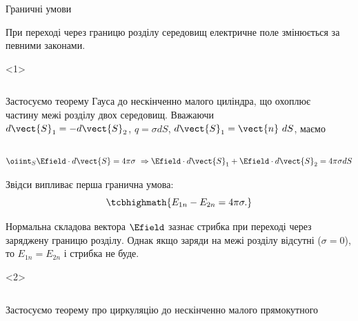 \documentclass{beamer}
\begin{document}
\begin{frame}{Граничні умови}{}
	\begin{block}{}
		При переході через границю розділу середовищ електричне поле змінюється за
		певними законами.
	\end{block}
	\begin{onlyenv}
		\begin{columns}
			\begin{column}{0.6\linewidth}
				\begin{block}{}\small\justifying
					Застосуємо теорему Гауса до нескінченно малого циліндра, що охоплює частину межі
					розділу двох
					середовищ. Вважаючи $d\vect{S}_1 = - d\vect{S}_2$, $q = \sigma dS$,
					$d\vect{S}_1 =
						\vect{n}\ dS$,
					маємо
				\end{block}
			\end{column}
			\begin{column}{0.4\linewidth}\centering
				
			\end{column}
		\end{columns}
		\begin{block}{}\small
			\begin{equation*}
				\oiint_S \Efield\cdot d\vect{S} = 4\pi\sigma\ \Rightarrow  \Efield\cdot
				d\vect{S}_1 +
				\Efield\cdot d\vect{S}_2 = 4\pi\sigma dS
			\end{equation*}
		\end{block}
		\begin{block}{}
			Звідси випливає перша гранична умова:
			\begin{equation*}
				\tcbhighmath{
					E_{1n} - E_{2n} = 4\pi\sigma.
				}
			\end{equation*}
		\end{block}
		\begin{alertblock}{}\justifying\small
			Нормальна складова вектора $\Efield$ зазнає стрибка при
			переході через заряджену границю розділу. Однак якщо заряди на межі розділу відсутні
			($\sigma =
				0$), то $E_{1n} = E_{2n}$ і стрибка не буде.
		\end{alertblock}
	\end{onlyenv}
	\begin{onlyenv}
		\begin{columns}
			\begin{column}{0.6\linewidth}
				\begin{block}{}\small\justifying
					Застосуємо теорему про циркуляцію до нескінченно малого прямокутного

\end{block}
\end{column}
\end{columns}
\end{onlyenv}
\end{frame}
\end{document}

